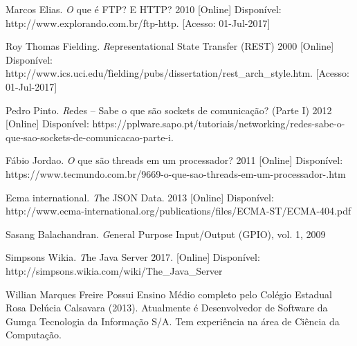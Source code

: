 \documentclass[journal]{IEEEtran}
\begin{document}
\begin{thebibliography}{1}
Marcos Elias. \emph O que é FTP? E HTTP? 2010 [Online]
Disponível: http://www.explorando.com.br/ftp-http. [Acesso: 01-Jul-2017]

Roy Thomas Fielding. \emph Representational State Transfer (REST) 2000 [Online] Disponível: http://www.ics.uci.edu/\~fielding/pubs/dissertation/rest\_arch\_style.htm.
[Acesso: 01-Jul-2017]

Pedro Pinto. \emph Redes – Sabe o que são sockets de comunicação? (Parte I) 2012 [Online] Disponível: https://pplware.sapo.pt/tutoriais/networking/redes-sabe-o-que-sao-sockets-de-comunicacao-parte-i.

Fábio Jordao. \emph O que são threads em um processador? 2011 [Online] Disponível: https://www.tecmundo.com.br/9669-o-que-sao-threads-em-um-processador-.htm

Ecma international. \emph The JSON Data. 2013 [Online] 
Disponível: http://www.ecma-international.org/publications/files/ECMA-ST/ECMA-404.pdf

Sasang Balachandran. \emph General Purpose
Input/Output (GPIO), vol. 1, 2009

Simpsons Wikia. \emph The Java Server 2017. [Online]
Disponível: http://simpsons.wikia.com/wiki/The\_Java\_Server

\end{thebibliography}

\clearpage

% 

\begin{IEEEbiography}{Willian Marques Freire}
Possui Ensino Médio completo pelo Colégio Estadual Rosa Delúcia Calsavara (2013). Atualmente é Desenvolvedor de Software da Gumga Tecnologia da Informação S/A. Tem experiência na área de Ciência da Computação.
\end{IEEEbiography}
\end{document}
